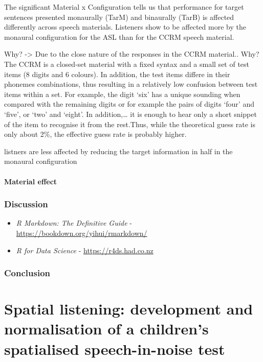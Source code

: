 \documentclass[a4paper, twoside]{templates/ociamthesis}
\begin{document}
The significant Material x Configuration tells us that performance for target sentences presented monaurally (TarM) and binaurally (TarB) is affected differently across speech materials. Listeners show to be affected more by the monaural configuration for the ASL than for the CCRM speech material.

Why? -\textgreater{} Due to the close nature of the responses in the CCRM material..
Why? The CCRM is a closed-set material with a fixed syntax and a small set of test items (8 digits and 6 colours). In addition, the test items differe in their phonemes combinations, thus resulting in a relatively low confusion between test items within a set. For example, the digit `six' has a unique sounding when compared with the remaining digits or for example the pairs of digits `four' and `five', or `two' and `eight'. In addition,\ldots{} it is enough to hear only a short snippet of the item to recognise it from the rest.Thus, while the theoretical guess rate is only about 2\%, the effective guess rate is probably higher.

listners are less affected by reducing the target information in half in the monaural configuration

\hypertarget{material-effect}{%
\subsubsection{Material effect}\label{material-effect}}

\hypertarget{discussion-2}{%
\subsection{Discussion}\label{discussion-2}}

\begin{itemize}
\item
  \emph{R Markdown: The Definitive Guide} - \url{https://bookdown.org/yihui/rmarkdown/}
\item
  \emph{R for Data Science} - \url{https://r4ds.had.co.nz}
\end{itemize}

\hypertarget{conclusion}{%
\subsection{Conclusion}\label{conclusion}}

\hypertarget{Chpt2}{%
\chapter{Spatial listening: development and normalisation of a children's spatialised speech-in-noise test}\label{Chpt2}}
\end{document}
